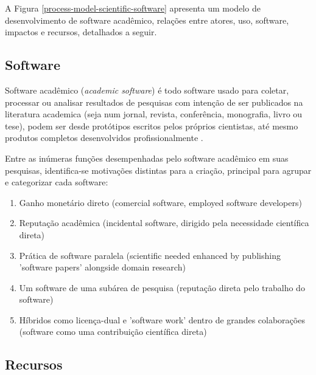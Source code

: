 A Figura \ref{process-model-scientific-software} apresenta um modelo de 
desenvolvimento de software acadêmico, relações entre atores, uso, software, 
impactos e recursos, detalhados a seguir.

\subsection{Software}

Software acadêmico ({\it academic software}) é todo software usado para
coletar, processar ou analisar resultados de pesquisas com intenção de ser
publicados na literatura academica (seja num jornal, revista, conferência,
monografia, livro ou tese), podem ser desde protótipos escritos pelos próprios
cientistas, até mesmo produtos completos desenvolvidos profissionalmente
\cite{allen2017engineering}.


Entre as inúmeras funções desempenhadas pelo software acadêmico em suas
pesquisas, identifica-se motivações distintas para a criação, principal
para agrupar e categorizar cada software:

\begin{enumerate}
  \item Ganho monetário direto (comercial software, employed software developers)
  \item Reputação acadêmica (incidental software, dirigido pela necessidade científica direta)
  \item Prática de software paralela (scientific needed enhanced by publishing 'software papers' alongside domain research)
  \item Um software de uma subárea de pesquisa (reputação direta pelo trabalho do software)
  \item Híbridos como licença-dual e 'software work' dentro de grandes colaborações (software como uma contribuição científica direta)
\end{enumerate}

\subsection{Recursos}


